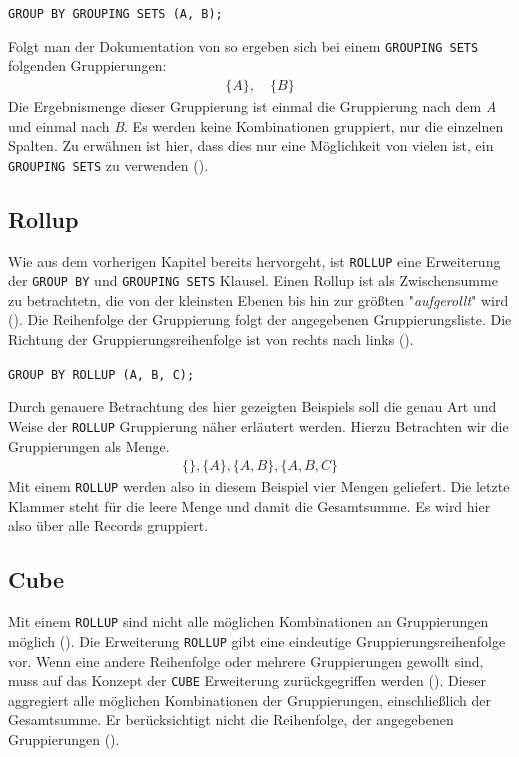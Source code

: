 \texttt{GROUP BY GROUPING SETS (A, B);}

Folgt man der Dokumentation von \cite{oracle16} so ergeben sich bei einem \texttt{GROUPING
SETS} folgenden Gruppierungen:
\begin{align*}
	\{A\}, \quad \{B\}
\end{align*}
Die Ergebnismenge dieser Gruppierung ist einmal die Gruppierung nach dem \textit{A}
und einmal nach \textit{B}. Es werden keine Kombinationen gruppiert, nur die einzelnen
Spalten. Zu erwähnen ist hier, dass dies nur eine Möglichkeit von vielen ist,
ein \texttt{GROUPING SETS} zu verwenden (\cite{oracle16}).

\subsection{Rollup}
Wie aus dem vorherigen Kapitel bereits hervorgeht, ist \texttt{ROLLUP} eine Erweiterung
der \texttt{GROUP BY} und \texttt{GROUPING SETS} Klausel. Einen Rollup ist als
Zwischensumme zu betrachtetn, die von der kleinsten Ebenen bis hin zur größten "\textit{aufgerollt}"
wird (\cite{oracle16}). Die Reihenfolge der Gruppierung folgt der angegebenen Gruppierungsliste.
Die Richtung der Gruppierungsreihenfolge ist von rechts nach links (\cite{oracle16}).

\texttt{GROUP BY ROLLUP (A, B, C);}

Durch genauere Betrachtung des hier gezeigten Beispiels soll die genau Art und
Weise der \texttt{ROLLUP} Gruppierung näher erläutert werden. Hierzu Betrachten
wir die Gruppierungen als Menge.
\begin{align*}
	\{ \}, \{A\}, \{A, B\}, \{A, B, C\}
\end{align*}
Mit einem \texttt{ROLLUP} werden also in diesem Beispiel vier Mengen geliefert. Die
letzte Klammer steht für die leere Menge und damit die Gesamtsumme. Es wird hier
also über alle Records gruppiert.

\subsection{Cube}
Mit einem \texttt{ROLLUP} sind nicht alle möglichen Kombinationen an Gruppierungen
möglich (\cite{oracle16}). Die Erweiterung \texttt{ROLLUP} gibt eine eindeutige Gruppierungsreihenfolge
vor. Wenn eine andere Reihenfolge oder mehrere Gruppierungen gewollt sind, muss auf
das Konzept der \texttt{CUBE} Erweiterung zurückgegriffen werden (\cite{oracle16}).
Dieser aggregiert alle möglichen Kombinationen der Gruppierungen, einschließlich
der Gesamtsumme. Er berücksichtigt nicht die Reihenfolge, der angegebenen
Gruppierungen (\cite{oracle16}).

